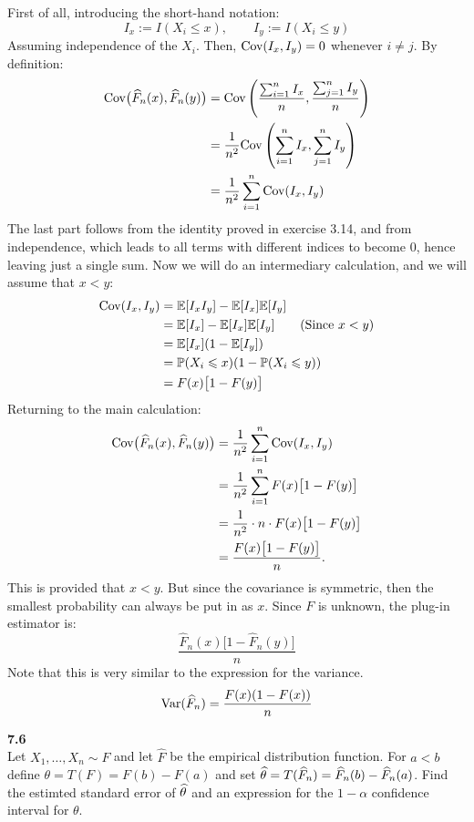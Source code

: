\medskip\noindent
First of all, introducing the short-hand notation:
$$
I_x := I(X_i\leq x),\qquad I_y := I(X_i\leq y)
$$
Assuming independence of the $X_i$. Then, $\text{Cov}(I_x, I_y) = 0$ whenever $i\not=j$. 
By definition:
\begin{align*}
    \Cov\big(\hat{F}_n(x), \hat{F}_n(y)\big)
    &= \Cov\left(\frac{\sum_{i=1}^n I_x}{n}, \frac{\sum_{j=1}^n I_y}{n}\right) \\
    &= \frac{1}{n^2} \Cov\left(\sum_{i=1}^n I_x, \sum_{j=1}^n I_y \right) \\
    &= \frac{1}{n^2} \sum_{i=1}^n \Cov(I_x, I_y) %
\end{align*}
The last part follows from the identity proved in exercise 3.14, and from independence, which
leads to all terms with different indices to become 0, hence leaving just a single sum.
Now we will do an intermediary calculation, and we will assume that $x < y$:
\begin{align*}
    \text{Cov}(I_x, I_y) &= \mathbb{E}[I_xI_y] - \mathbb{E}[I_x]\mathbb{E}[I_y] \\
    &= \mathbb{E}[I_x] - \mathbb{E}[I_x]\mathbb{E}[I_y] \tag{Since $x < y$}\\
    &= \mathbb{E}[I_x](1 - \mathbb{E}[I_y]) \\
    &= \mathbb{P}(X_i\leqslant x)(1 - \mathbb{P}(X_i\leqslant y)) \\
    &= F(x)\big[1 - F(y)\big] 
\end{align*}
Returning to the main calculation:
\begin{align*}
    \text{Cov}\big(\widehat{F}_n(x), \widehat{F}_n(y)\big)
    &= \frac{1}{n^2} \sum_{i=1}^n \text{Cov}(I_x, I_y) \\
    &= \frac{1}{n^2} \sum_{i=1}^n F(x)\big[1 - F(y)\big] \\
    &= \frac{1}{n^2}\cdot n\cdot F(x)\big[1 - F(y)\big] \\
    &= \frac{F(x)\big[1 - F(y)\big]}{n}.
\end{align*}
This is provided that $x<y$. But since the covariance is symmetric, then the smallest probability
can always be put in as $x$. Since $F$ is unknown, the plug-in estimator is:
$$
\frac{\hat{F}_n(x)\big[1 - \hat{F}_n(y)\big]}{n}
$$
Note that this is very similar to the expression for the variance.
$$
\text{Var}(\widehat{F}_n) = \frac{F(x)(1 - F(x))}{n}
$$

\newpage\noindent
\textbf{7.6}\\  %
Let $X_1,\ldots, X_n \sim F$ and let $\hat{F}$ be the empirical distribution function.
For $a<b$ define $\theta = T(F) = F(b) - F(a)$ and set
$\widehat{\theta} = T(\widehat{F}_n) = \widehat{F}_n(b) - \widehat{F}_n(a)$. Find the estimted standard error of $\widehat{\theta}$
and an expression for the $1-\alpha$ confidence interval for $\theta$.

